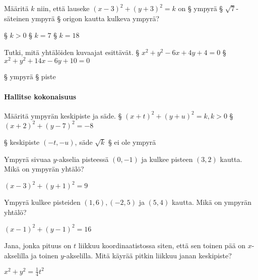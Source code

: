 \begin{tehtavasivu}
\begin{tehtava}
	Määritä $k$ niin, että lauseke $(x-3)^2+(y+3)^2=k$ on
	\alakohdat
			§ ympyrä
			§ $\sqrt{7}$-säteinen ympyrä
			§ origon kautta kulkeva ympyrä?
	\loppu
	\begin{vastaus}
		\alakohdat
			§ $k>0$
			§ $k=7$
			§ $k=18$
		\loppu
	\end{vastaus}
\end{tehtava}

\begin{tehtava}
	Tutki, mitä yhtälöiden kuvaajat esittävät.
	\alakohdat
		§ $x^2+y^2-6x+4y+4=0$
		§ $x^2+y^2+14x-6y+10=0$
	\loppu
	\begin{vastaus}
		\alakohdat
			§ ympyrä
			§ piste
		\loppu
	\end{vastaus}
\end{tehtava}

\paragraph*{Hallitse kokonaisuus}

\begin{tehtava}
	Määritä ympyrän keskipiste ja säde.
	\alakohdat
		§ $(x+t)^2+(y+u)^2=k, k>0$
		§ $(x+2)^2+(y-7)^2=-8$
	\loppu
	\begin{vastaus}
		\alakohdat
			§ keskipiste $(-t, -u)$, säde  $\sqrt{k}$
			§ ei ole ympyrä
		\loppu
	\end{vastaus}
\end{tehtava}

\begin{tehtava}
	Ympyrä sivuaa $y$-akselia pisteessä $(0, -1)$ ja kulkee pisteen $(3, 2)$ kautta. Mikä on ympyrän yhtälö?
	\begin{vastaus}
		$(x-3)^2+(y+1)^2=9$
	\end{vastaus}
\end{tehtava}

\begin{tehtava}
	Ympyrä kulkee pisteiden $(1, 6), (-2, 5)$ ja $(5, 4)$ kautta. Mikä on ympyrän yhtälö?
	\begin{vastaus}
		$(x-1)^2+(y-1)^2=16$
	\end{vastaus}
\end{tehtava}

\begin{tehtava}
	Jana, jonka pituus on $t$ liikkuu koordinaatistossa siten, että sen toinen pää on $x$-akselilla ja toinen $y$-akselilla. Mitä käyrää pitkin liikkuu janan keskipiste?
	\begin{vastaus}
		$x^2+y^2=\frac{1}{4}t^2$
	\end{vastaus}
\end{tehtava}


\end{tehtavasivu}
